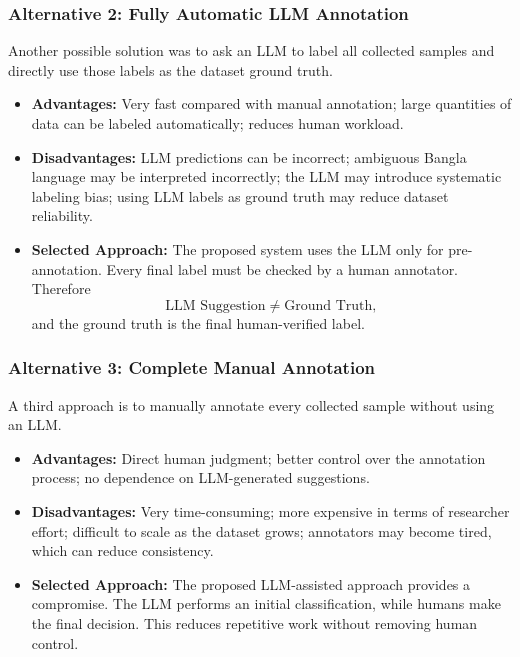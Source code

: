 \documentclass[12pt,a4paper]{report}
\begin{document}
\subsubsection{Alternative 2: Fully Automatic LLM Annotation}
Another possible solution was to ask an LLM to label all collected samples and
directly use those labels as the dataset ground truth.
\begin{itemize}
  \item \textbf{Advantages:} Very fast compared with manual annotation; large
        quantities of data can be labeled automatically; reduces human workload.
  \item \textbf{Disadvantages:} LLM predictions can be incorrect; ambiguous Bangla
        language may be interpreted incorrectly; the LLM may introduce systematic
        labeling bias; using LLM labels as ground truth may reduce dataset
        reliability.
  \item \textbf{Selected Approach:} The proposed system uses the LLM only for
        pre-annotation. Every final label must be checked by a human annotator.
        Therefore
        \[\text{LLM Suggestion}\neq\text{Ground Truth},\]
        and the ground truth is the final human-verified label.
\end{itemize}

\subsubsection{Alternative 3: Complete Manual Annotation}
A third approach is to manually annotate every collected sample without using an LLM.
\begin{itemize}
  \item \textbf{Advantages:} Direct human judgment; better control over the
        annotation process; no dependence on LLM-generated suggestions.
  \item \textbf{Disadvantages:} Very time-consuming; more expensive in terms of
        researcher effort; difficult to scale as the dataset grows; annotators may
        become tired, which can reduce consistency.
  \item \textbf{Selected Approach:} The proposed LLM-assisted approach provides a
        compromise. The LLM performs an initial classification, while humans make
        the final decision. This reduces repetitive work without removing human
        control.
\end{itemize}
\end{document}
